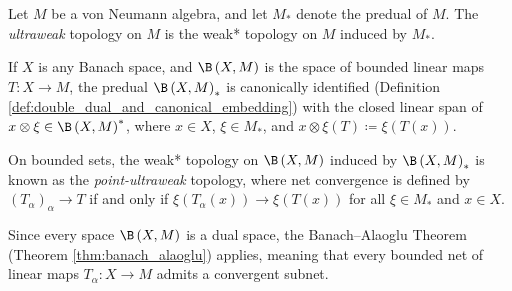\begin{definition}
  Let $M$ be a von Neumann algebra, and let $M_{\ast}$ denote the predual of $M$. The \textit{ultraweak} topology on $M$ is the weak* topology on $M$ induced by $M_{\ast}$.\newline

  If $X$ is any Banach space, and $\B\left( X,M \right)$ is the space of bounded linear maps $T\colon X\rightarrow M$, the predual $\B\left( X,M \right)_{\ast}$ is canonically identified (Definition \ref{def:double_dual_and_canonical_embedding}) with the closed linear span of $x\otimes \xi\in \B\left( X,M \right)^{\ast}$, where $x\in X$, $\xi\in M_{\ast}$, and $x\otimes \xi\left( T \right) \coloneq \xi\left( T(x) \right)$.\newline

  On bounded sets, the weak* topology on $\B\left( X,M \right)$ induced by $\B\left( X,M \right)_{\ast}$ is known as the \textit{point-ultraweak} topology, where net convergence is defined by $\left( T_{\alpha} \right)_{\alpha}\rightarrow T$ if and only if $\xi\left( T_{\alpha}\left( x \right) \right) \rightarrow \xi\left( T\left( x \right) \right)$ for all $\xi\in M_{\ast}$ and $x\in X$.
\end{definition}
Since every space $\B\left( X,M \right)$ is a dual space, the Banach--Alaoglu Theorem (Theorem \ref{thm:banach_alaoglu}) applies, meaning that every bounded net of linear maps $T_{\alpha}\colon X\rightarrow M$ admits a convergent subnet.\newline

